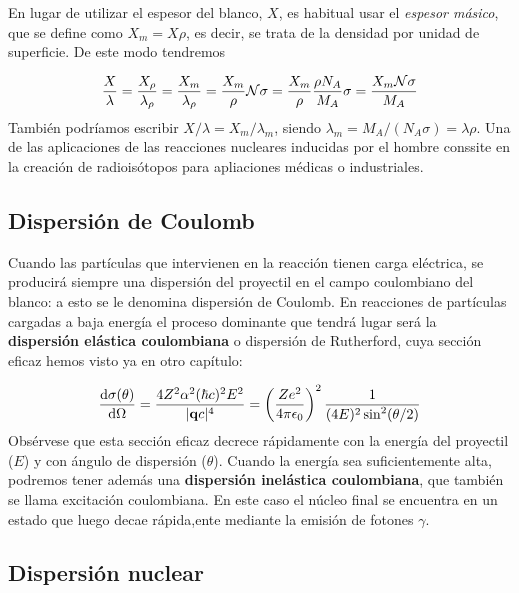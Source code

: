 En lugar de utilizar el espesor del blanco, $X$, es habitual usar el \textit{espesor másico}, que se define como $X_m=X\rho$, es decir, se trata de la densidad por unidad de superficie. De este modo tendremos 

\begin{equation}
    \frac{X}{\lambda} = \frac{X_\rho}{\lambda_\rho} = \frac{X_m}{\lambda_\rho} = \frac{X_m}{\rho} \mathcal{N} \sigma = \frac{X_m}{\rho} \frac{\rho N_A}{M_A} \sigma = \frac{X_m \mathcal{N} \sigma}{M_A}
\end{equation}
También podríamos escribir $X/\lambda=X_m/\lambda_m$, siendo $\lambda_m = M_A /(N_A\sigma)=\lambda \rho$. Una de las aplicaciones de las reacciones nucleares inducidas por el hombre conssite en la creación de radioisótopos para apliaciones médicas o industriales.



\subsection{Dispersión de Coulomb}

Cuando las partículas que intervienen en la reacción tienen carga eléctrica, se producirá siempre una dispersión del proyectil en el campo coulombiano del blanco: a esto se le denomina dispersión de Coulomb. En reacciones de partículas cargadas a baja energía el proceso dominante que tendrá lugar será la \textbf{dispersión elástica coulombiana} o dispersión de Rutherford, cuya sección eficaz hemos visto ya en otro capítulo:

\begin{equation}
    \frac{\mathrm{d} \sigma(\theta)}{\mathrm{d} \Omega} = \frac{4 Z^2 \alpha^2 (\hbar c)^2 E^2}{|\mathbf{q} c|^4} = \left( \frac{Ze^2}{4 \pi \epsilon_0} \right)^2 \frac{1}{(4E)^2 \sin^2(\theta/2)}
\end{equation}
Obsérvese que esta sección eficaz decrece rápidamente con la energía del proyectil ($E$) y con ángulo de dispersión ($\theta$). Cuando la energía sea suficientemente alta, podremos tener además una \textbf{dispersión inelástica coulombiana}, que también se llama excitación coulombiana. En este caso el núcleo final se encuentra en un estado que luego decae rápida,ente mediante la emisión de fotones $\gamma$. 

\subsection{Dispersión nuclear}

